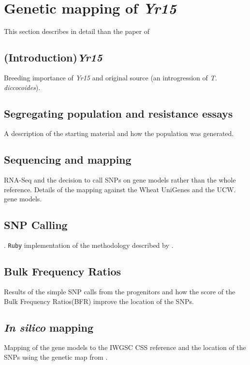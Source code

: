 
\chapter{Genetic mapping of \textit{Yr15}}
\label{yr15}
This section describes in detail than the paper of \citet{Ramirez-Gonzalez-2014}


\section{(Introduction)\textit{Yr15}} 
Breeding importance of \textit{Yr15} and original source (an introgression of \textit{T. diccocoides}). 

\section{Segregating population and resistance essays}
A description of the starting material and how the population was generated.  

\section{Sequencing and mapping} 

RNA-Seq and the decision to call SNPs on gene models rather than the whole reference.  Details of the mapping against the Wheat UniGenes \cite{PontiusJUWagnerL2002} and the UCW. \cite{Krasileva2013} gene models.  

\section{SNP Calling}. 
\verb|Ruby| implementation of the methodology described by \citet{Trick2012}. 

\section{Bulk Frequency Ratios} 
Results of the simple SNP calls from the progenitors and how the score of the Bulk Frequency Ratios(BFR) improve the location of the SNPs. 

\section{\textit{In silico} mapping}
Mapping of the gene models to the IWGSC CSS \cite{Mayer2014} reference and the location of the SNPs using the genetic map from \citet{Wang2014}.


